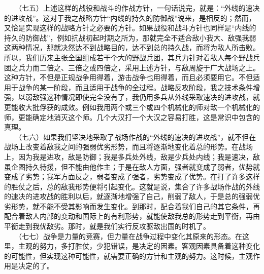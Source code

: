 \documentclass[cn,11pt,chinese]{elegantbook}
\begin{document}
　　（七五）上述这样的战役和战斗的作战方针，一句话说完，就是：“外线的速决的进攻战”。这对于我之战略方针“内线的持久的防御战”说来，是相反的；然而，又恰是实现这样的战略方针之必要的方针。如果战役和战斗方针也同样是“内线的持久的防御战”，例如抗战初起时期之所为，那就完全不适合敌小我大、敌强我弱这两种情况，那就决然达不到战略目的，达不到总的持久战，而将为敌人所击败。所以，我们历来主张全国组成若干个大的野战兵团，其兵力针对着敌人每个野战兵团之兵力而二倍之、三倍之或四倍之，采用上述方针，与敌周旋于广大战场之上。这种方针，不但是正规战争用得着，游击战争也用得着，而且必须要用它。不但适用于战争的某一阶段，而且适用于战争的全过程。战略反攻阶段，我之技术条件增强，以弱敌强这种情况即使完全没有了，我仍用多兵从外线采取速决的进攻战，就更能收大批俘获的成效。例如我用两个或三个或四个机械化的师对敌一个机械化的师，更能确定地消灭这个师。几个大汉打一个大汉之容易打胜，这是常识中包含的真理。\\
　　（七六）如果我们坚决地采取了战场作战的“外线的速决的进攻战”，就不但在战场上改变着敌我之间的强弱优劣形势，而且将逐渐地变化着总的形势。在战场上，因为我是进攻，敌是防御；我是多兵处外线，敌是少兵处内线；我是速决，敌虽企图持久待援，但不能由他作主；于是在敌人方面，强者就变成了弱者，优势就变成了劣势；我军方面反之，弱者变成了强者，劣势变成了优势。在打了许多这样的胜仗之后，总的敌我形势便将引起变化。这就是说，集合了许多战场作战的外线的速决的进攻战的胜利以后，就逐渐地增强了自己，削弱了敌人，于是总的强弱优劣形势，就不能不受其影响而发生变化。到那时，配合着我们自己的其它条件，再配合着敌人内部的变动和国际上的有利形势，就能使敌我总的形势走到平衡，再由平衡走到我优敌劣。那时，就是我们实行反攻驱敌出国的时机了。\\
　　（七七）战争是力量的竞赛，但力量在战争过程中变化其原来的形态。在这里，主观的努力，多打胜仗，少犯错误，是决定的因素。客观因素具备着这种变化的可能性，但实现这种可能性，就需要正确的方针和主观的努力。这时候，主观作用是决定的了。\\
\end{document}
